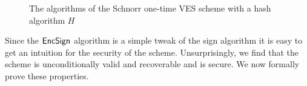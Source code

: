 \begin{figure}[h]
\begin{mdframed}
\begin{pchstack}[center]
    \pchspace
    \end{pchstack}
    \begin{pchstack}[center]
    \pchspace
    \pchspace
    \pchspace
    \end{pchstack}
    \end{mdframed}
    \caption{The algorithms of the Schnorr one-time VES scheme with a hash algorithm $H$}
    \label{fig:schnorr-ves}
\end{figure}

Since the $\textsf{EncSign}$ algorithm is a simple tweak of the sign algorithm it is easy to get an intuition for the security of the scheme. Unsurprisingly, we find that the scheme is unconditionally valid and recoverable and is \EUFCMAVES secure. We now formally prove these properties.

